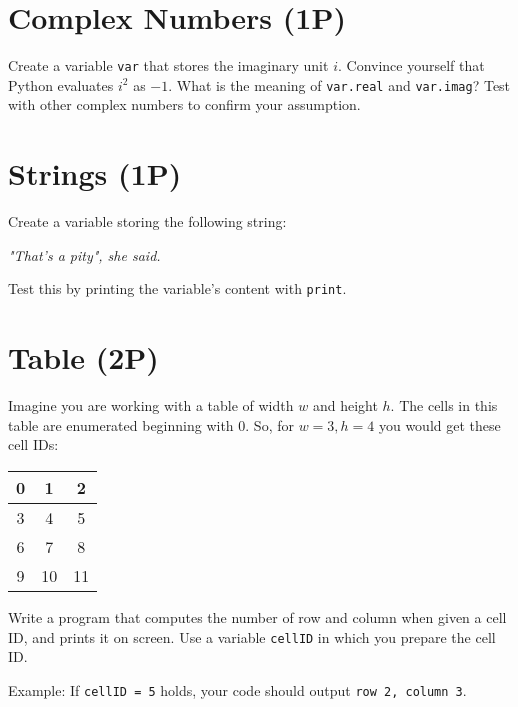 \documentclass[
	english,
	fontsize=10pt,
	parskip=half,
	titlepage=true,
	DIV=12
]{scrartcl}
\newcommand*{\tabcrlf}{\\ \hline}
\newcommand*{\inPy}[1]{\texttt{#1}}
\begin{document}
\section{Complex Numbers (1\;P)}
Create a variable \texttt{var} that stores the imaginary unit $i$. Convince yourself that Python evaluates $i^2$ as $-1$. What is the meaning of \texttt{var.real} and \texttt{var.imag}? Test with other complex numbers to confirm your assumption.

\section{Strings (1\;P)}
Create a variable storing the following string:
\begin{center}
	\emph{"That's a pity", she said.}
\end{center}

Test this by printing the variable's content with \inPy{print}.

\section{Table (2\;P)}
Imagine you are working with a table of width $w$ and height $h$. The cells in this table are enumerated beginning with 0. So, for $w = 3, h = 4$ you would get these cell IDs:
\begin{center}
\begin{tabular}{|c|c|c|}
	\hline
	 0 &  1 &  2 \tabcrlf 
	 3 &  4 &  5 \tabcrlf
	 6 &  7 &  8 \tabcrlf
	 9 & 10 & 11 \tabcrlf
\end{tabular}
\end{center}

Write a program that computes the number of row and column when given a cell ID, and prints it on screen. Use a variable \texttt{cellID} in which you prepare the cell ID.

Example: If \inPy{cellID = 5} holds, your code should output \texttt{row 2, column 3}.
\end{document}
